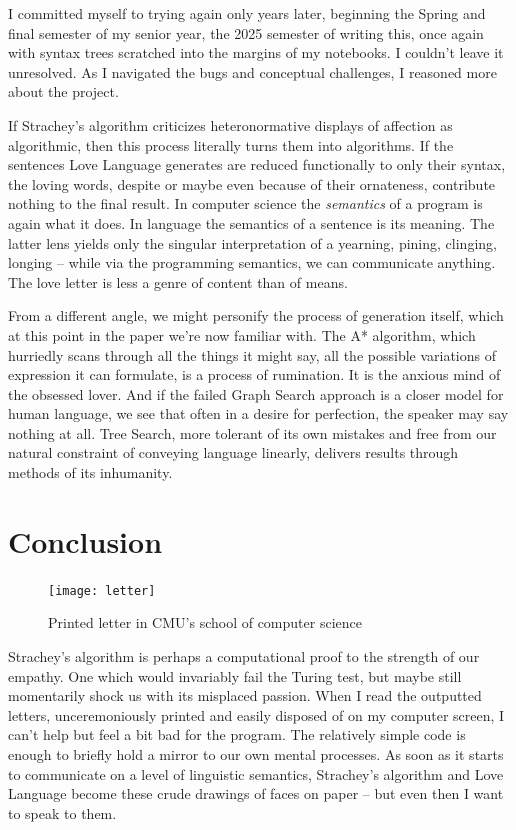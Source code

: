 \documentclass[runningheads]{llncs}
\begin{document}
I committed myself to trying again only years later, beginning the Spring and final semester of my senior year, the 2025 semester of writing this, once again with syntax trees scratched into the margins of my notebooks. I couldn't leave it unresolved. As I navigated the bugs and conceptual challenges, I reasoned more about the project.

If Strachey's algorithm criticizes heteronormative displays of affection as algorithmic, then this process literally turns them into algorithms. If the sentences Love Language generates are reduced functionally to only their syntax, the loving words, despite or maybe even because of their ornateness, contribute nothing to the final result. In computer science the \textit{semantics} of a program is again what it does. In language the semantics of a sentence is its meaning. The latter lens yields only the singular interpretation of a yearning, pining, clinging, longing -- while via the programming semantics, we can communicate anything. The love letter is less a genre of content than of means.

From a different angle, we might personify the process of generation itself, which at this point in the paper we're now familiar with. The A* algorithm, which hurriedly scans through all the things it might say, all the possible variations of expression it can formulate, is a process of rumination. It is the anxious mind of the obsessed lover. And if the failed Graph Search approach is a closer model for human language, we see that often in a desire for perfection, the speaker may say nothing at all. Tree Search, more tolerant of its own mistakes and free from our natural constraint of conveying language linearly, delivers results through methods of its inhumanity.

\section{Conclusion}
\begin{figure}
\vspace{-4em}
  \begin{center}
    \texttt{[image: letter]}
  \end{center}
\vspace{-1em}
  \caption{Printed letter in CMU's school of computer science}
\vspace{-2em}
\end{figure}
Strachey’s algorithm is perhaps a computational proof to the strength of our empathy. One which would invariably fail the Turing test, but maybe still momentarily shock us with its misplaced passion. When I read the outputted letters, unceremoniously printed and easily disposed of on my computer screen, I can’t help but feel a bit bad for the program. The relatively simple code is enough to briefly hold a mirror to our own mental processes. As soon as it starts to communicate on a level of linguistic semantics, Strachey’s algorithm and Love Language become these crude drawings of faces on paper -- but even then I want to speak to them.
\end{document}
